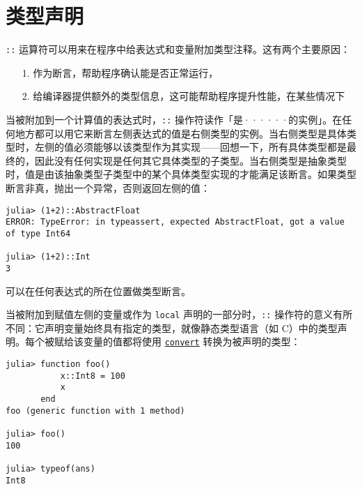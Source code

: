 \section{类型声明}



\texttt{::} 运算符可以用来在程序中给表达式和变量附加类型注释。这有两个主要原因：



\begin{itemize}
\item[1. ] 作为断言，帮助程序确认能是否正常运行，


\item[2. ] 给编译器提供额外的类型信息，这可能帮助程序提升性能，在某些情况下

\end{itemize}


当被附加到一个计算值的表达式时，\texttt{::} 操作符读作「是······的实例」。在任何地方都可以用它来断言左侧表达式的值是右侧类型的实例。当右侧类型是具体类型时，左侧的值必须能够以该类型作为其实现——回想一下，所有具体类型都是最终的，因此没有任何实现是任何其它具体类型的子类型。当右侧类型是抽象类型时，值是由该抽象类型子类型中的某个具体类型实现的才能满足该断言。如果类型断言非真，抛出一个异常，否则返回左侧的值：




\begin{verbatim}
julia> (1+2)::AbstractFloat
ERROR: TypeError: in typeassert, expected AbstractFloat, got a value of type Int64

julia> (1+2)::Int
3
\end{verbatim}



可以在任何表达式的所在位置做类型断言。



当被附加到赋值左侧的变量或作为 \texttt{local} 声明的一部分时，\texttt{::} 操作符的意义有所不同：它声明变量始终具有指定的类型，就像静态类型语言（如 C）中的类型声明。每个被赋给该变量的值都将使用 \hyperlink{1846942650946171605}{\texttt{convert}} 转换为被声明的类型：




\begin{verbatim}
julia> function foo()
           x::Int8 = 100
           x
       end
foo (generic function with 1 method)

julia> foo()
100

julia> typeof(ans)
Int8
\end{verbatim}



